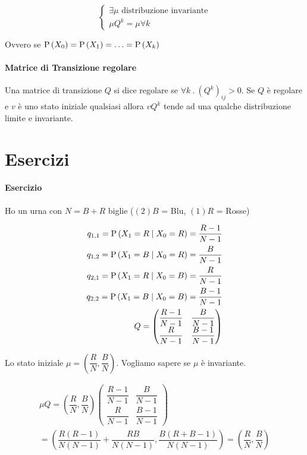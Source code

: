 \[ \begin{cases}
\exists \mu \text{ distribuzione invariante} \\
\mu Q^k = \mu \forall k 
\end{cases} \]

Ovvero se $ \text{P}\left(X_0\right) = \text{P}\left(X_1\right) = \hdots = \text{P}\left(X_k\right) $

\paragraph{Matrice di Transizione regolare}
Una matrice di transizione $ Q $ si dice regolare se $ \forall k \>.\> (Q^k)_{ij} > 0 $. Se $ Q $ è regolare e $ v $ è uno stato iniziale qualsiasi allora $ vQ^k $ tende ad una qualche distribuzione limite e invariante.

\section{Esercizi}

\paragraph{Esercizio}

Ho un urna con $ N = B + R$ biglie ($(2) B $ = Blu, $ (1) R $ = Rosse)

\[ \begin{aligned}
q_{1,1} = \text{P}\left(X_1 = R \mid X_0 = R\right) = \dfrac{R-1}{N-1} \\
q_{1,2} = \text{P}\left(X_1 = B \mid X_0 = R\right) = \dfrac{B}{N-1} \\
q_{2,1} = \text{P}\left(X_1 = R \mid X_0 = B\right) = \dfrac{R}{N-1} \\
q_{2,2} = \text{P}\left(X_1 = B \mid X_0 = B\right) = \dfrac{B-1}{N-1} \\
Q = \begin{pmatrix}
\dfrac{R-1}{N-1} & \dfrac{B}{N-1} \\
\dfrac{R}{N-1} & \dfrac{B-1}{N-1}
\end{pmatrix}
\end{aligned} \]

Lo stato iniziale $ \mu = \left(\dfrac{R}{N}, \dfrac{B}{N}\right) $. Vogliamo sapere se $ \mu $ è invariante.

\[ \begin{aligned}
\mu Q = \left(\dfrac{R}{N}, \dfrac{B}{N}\right)\begin{pmatrix}
\dfrac{R-1}{N-1} & \dfrac{B}{N-1} \\
\dfrac{R}{N-1} & \dfrac{B-1}{N-1}
\end{pmatrix} \\
= \left(\dfrac{R(R-1)}{N(N-1)} + \dfrac{RB}{N(N-1)}, \dfrac{B(R+B-1)}{N(N-1)}\right) = \left(\dfrac{R}{N}, \dfrac{B}{N}\right)
\end{aligned} \]

